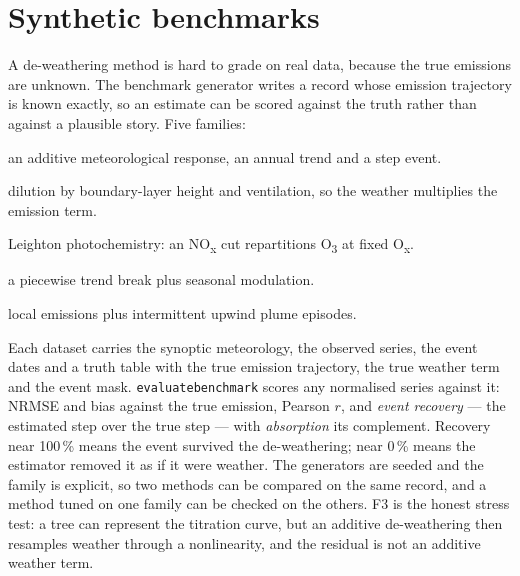 \documentclass[11pt]{report}
\newcommand{\nosep}{\setlength{\itemsep}{0pt}\setlength{\parskip}{0pt}\setlength{\topsep}{2pt}}
\newcommand{\codeunderscore}{\textunderscore\allowbreak}
\newcommand{\code}[1]{\texttt{\let\_\codeunderscore #1}}
\newcommand{\NOx}{NO\textsubscript{x}}
\begin{document}
\section{Synthetic benchmarks}\label{sec:benchtheory}
A de-weathering method is hard to grade on real data, because the true emissions are
unknown. The benchmark generator writes a record whose emission trajectory is known
exactly, so an estimate can be scored against the truth rather than against a plausible
story. Five families:
\begin{description}\nosep
  \item[\code{F1\_additive}] an additive meteorological response, an annual trend and a
        step event.
  \item[\code{F2\_multiplicative}] dilution by boundary-layer height and ventilation,
        so the weather multiplies the emission term.
  \item[\code{F3\_titration}] Leighton photochemistry: an \NOx{} cut repartitions
        O\textsubscript{3} at fixed O\textsubscript{x}.
  \item[\code{F4\_nonstationary}] a piecewise trend break plus seasonal modulation.
  \item[\code{F5\_transport}] local emissions plus intermittent upwind plume episodes.
\end{description}
Each dataset carries the synoptic meteorology, the observed series, the event dates
and a truth table with the true emission trajectory, the true weather term and the
event mask. \code{evaluate\_benchmark} scores any normalised series against it:
NRMSE and bias against the true emission, Pearson $r$, and \emph{event recovery} ---
the estimated step over the true step --- with \emph{absorption} its complement.
Recovery near 100\,\% means the event survived the de-weathering; near 0\,\% means
the estimator removed it as if it were weather. The generators are seeded and the
family is explicit, so two methods can be compared on the same record, and a method
tuned on one family can be checked on the others. F3 is the honest stress test: a
tree can represent the titration curve, but an additive de-weathering then resamples
weather through a nonlinearity, and the residual is not an additive weather term.
\end{document}
